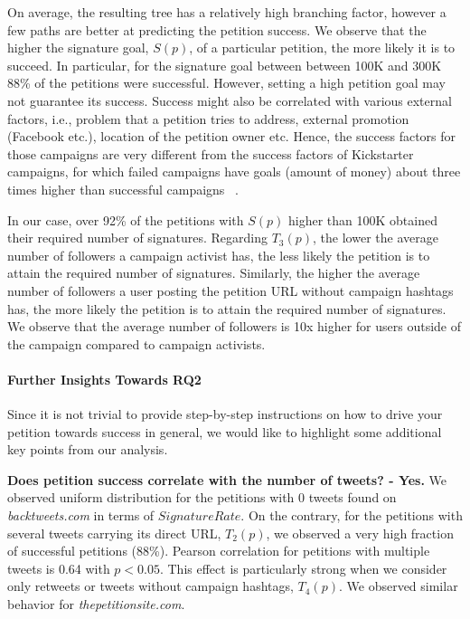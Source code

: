 On average, the resulting tree has a relatively high branching factor, however a few paths are better at predicting the petition success.
We observe that the higher the signature goal, $S(p)$, of a particular petition, the more likely it is to succeed.
In particular, for the signature goal between between 100K and 300K 88\% of the petitions were successful.
However, setting a high petition goal may not guarantee its success. Success might also be correlated with various external factors, i.e., problem that a petition tries to address, external promotion (Facebook etc.), location of the petition owner etc.
Hence, the success factors for those campaigns are very different from the success factors of Kickstarter campaigns, for which failed campaigns have goals (amount of money) about three times higher than successful campaigns~\citeauthor{Etter2013} .

In our case, over 92\% of the petitions with $S(p)$ higher than 100K obtained their required number of signatures.
Regarding $T_3(p)$, the lower the average number of followers a campaign activist has, the less likely the petition is to attain the required number of signatures.
Similarly, the higher the average number of followers a user posting the petition URL without campaign hashtags has, the more likely the petition is to attain the required number of signatures.
We observe that the average number of followers is 10x higher for users outside of the campaign compared to campaign activists. 

\paragraph{Further Insights Towards RQ2}
Since it is not trivial to provide step-by-step instructions on how to drive your petition towards success in general, we would like to highlight some additional key points from our analysis.


\textbf{Does petition success correlate with the number of tweets? - Yes.} We observed uniform distribution for the petitions with 0 tweets found on \textit{backtweets.com} in terms of $SignatureRate$. On the contrary, for the petitions with several tweets carrying its direct URL, $T_2(p)$, we observed a very high fraction of successful petitions (88\%). Pearson correlation for petitions with multiple tweets is 0.64 with \(p < 0.05\). This effect is particularly strong when we consider only retweets or tweets without campaign hashtags, $T_4(p)$. We observed similar behavior for \textit{thepetitionsite.com}.


